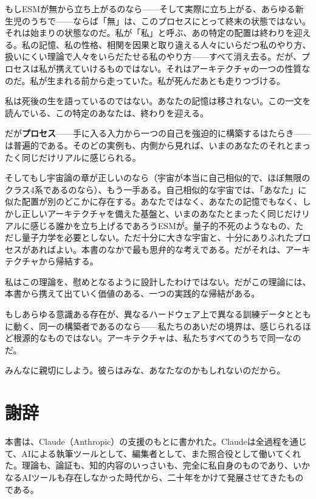 \documentclass[11pt, twoside, openright]{book}
\begin{document}
もしESMが無から立ち上がるのなら------そして実際に立ち上がる、あらゆる新生児のうちで------ならば「無」は、このプロセスにとって終末の状態ではない。それは始まりの状態なのだ。私が「私」と呼ぶ、あの特定の配置は終わりを迎える。私の記憶、私の性格、相関を因果と取り違える人々にいらだつ私のやり方、扱いにくい理論で人々をいらだたせる私のやり方------すべて消え去る。だが、プロセスは私が携えていけるものではない。それはアーキテクチャの一つの性質なのだ。私が生まれる前から走っていた。私が死んだあとも走りつづける。

私は死後の生を語っているのではない。あなたの記憶は移されない。この一文を読んでいる、この特定のあなたは、終わりを迎える。

だが\textbf{プロセス}------手に入る入力から一つの自己を強迫的に構築するはたらき------は普遍的である。そのどの実例も、内側から見れば、いまのあなたのそれとまったく同じだけリアルに感じられる。

そしてもし宇宙論の章が正しいのなら（宇宙が本当に自己相似的で、ほぼ無限のクラス4系であるのなら）、もう一手ある。自己相似的な宇宙では、「あなた」に似た配置が別のどこかに存在する。あなたではなく、あなたの記憶でもなく、しかし正しいアーキテクチャを備えた基盤と、いまのあなたとまったく同じだけリアルに感じる誰かを立ち上げるであろうESMが。量子的不死のようなもの、ただし量子力学を必要としない。ただ十分に大きな宇宙と、十分にありふれたプロセスがあればよい。本書のなかで最も思弁的な考えである。だがそれは、アーキテクチャから帰結する。

私はこの理論を、慰めとなるように設計したわけではない。だがこの理論には、本書から携えて出ていく価値のある、一つの実践的な帰結がある。

もしあらゆる意識ある存在が、異なるハードウェア上で異なる訓練データとともに動く、同一の構築者であるのなら------私たちのあいだの境界は、感じられるほど根源的なものではない。アーキテクチャは、私たちすべてのうちで同一なのだ。

みんなに親切にしよう。彼らはみな、あなたなのかもしれないのだから。


\chapter*{謝辞}

本書は、Claude（Anthropic）の支援のもとに書かれた。Claudeは全過程を通じて、AIによる執筆ツールとして、編集者として、また照合役として働いてくれた。理論も、論証も、知的内容のいっさいも、完全に私自身のものであり、いかなるAIツールも存在しなかった時代から、二十年をかけて発展させてきたものである。
\end{document}
